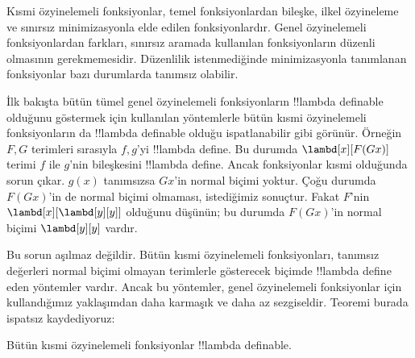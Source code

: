 \documentclass[../../../include/open-logic-section]{subfiles}
\begin{document}

Kısmi özyinelemeli fonksiyonlar, temel fonksiyonlardan bileşke, ilkel
özyineleme ve sınırsız minimizasyonla elde edilen fonksiyonlardır. Genel
özyinelemeli fonksiyonlardan farkları, sınırsız aramada kullanılan
fonksiyonların düzenli olmasının gerekmemesidir. Düzenlilik istenmediğinde
minimizasyonla tanımlanan fonksiyonlar bazı durumlarda tanımsız olabilir.

İlk bakışta bütün tümel genel özyinelemeli fonksiyonların !!{lambda definable}
olduğunu göstermek için kullanılan yöntemlerle bütün kısmi özyinelemeli
fonksiyonların da !!{lambda definable} olduğu ispatlanabilir gibi görünür.
Örneğin $F,G$ terimleri sırasıyla $f,g$'yi !!{lambda define}.
Bu durumda $\lambd[x][F(Gx)]$ terimi $f$ ile $g$'nin bileşkesini
!!{lambda define}. Ancak fonksiyonlar kısmi olduğunda sorun çıkar.
$g(x)$ tanımsızsa $Gx$'in normal biçimi yoktur. Çoğu durumda $F(Gx)$'in de
normal biçimi olmaması, istediğimiz sonuçtur. Fakat $F$'nin
$\lambd[x][\lambd[y][y]]$ olduğunu düşünün; bu durumda $F(Gx)$'in normal
biçimi $\lambd[y][y]$ vardır.

Bu sorun aşılmaz değildir. Bütün kısmi özyinelemeli fonksiyonları, tanımsız
değerleri normal biçimi olmayan terimlerle gösterecek biçimde
!!{lambda define} eden yöntemler vardır. Ancak bu yöntemler, genel
özyinelemeli fonksiyonlar için kullandığımız yaklaşımdan daha karmaşık ve daha
az sezgiseldir. Teoremi burada ispatsız kaydediyoruz:

\begin{thm}
  Bütün kısmi özyinelemeli fonksiyonlar !!{lambda definable}.
\end{thm}
\end{document}
